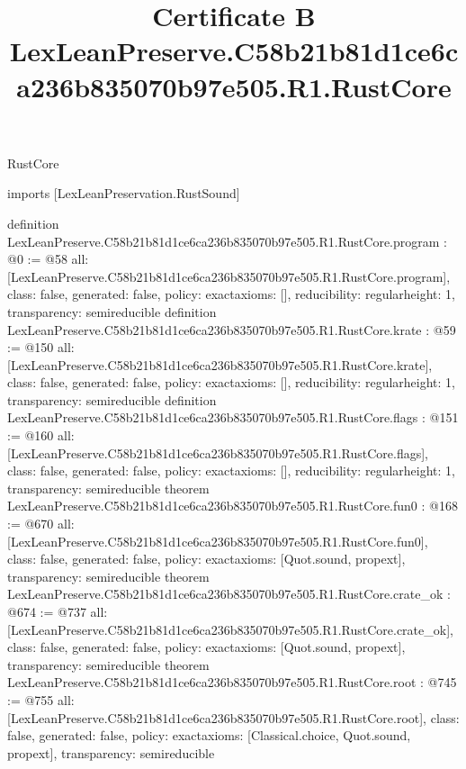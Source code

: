 \begin{lexlean}{RustCore}
\title{Certificate B LexLeanPreserve.C58b21b81d1ce6ca236b835070b97e505.R1.RustCore}
\begin{coremodule}
imports [LexLeanPreservation.RustSound]

definition LexLeanPreserve.C58b21b81d1ce6ca236b835070b97e505.R1.RustCore.program : @0 := @58 {
  all: [LexLeanPreserve.C58b21b81d1ce6ca236b835070b97e505.R1.RustCore.program],
  class: false,
  generated: false,
  policy: exact{axioms: []},
  reducibility: regular{height: 1},
  transparency: semireducible
}
definition LexLeanPreserve.C58b21b81d1ce6ca236b835070b97e505.R1.RustCore.krate : @59 := @150 {
  all: [LexLeanPreserve.C58b21b81d1ce6ca236b835070b97e505.R1.RustCore.krate],
  class: false,
  generated: false,
  policy: exact{axioms: []},
  reducibility: regular{height: 1},
  transparency: semireducible
}
definition LexLeanPreserve.C58b21b81d1ce6ca236b835070b97e505.R1.RustCore.flags : @151 := @160 {
  all: [LexLeanPreserve.C58b21b81d1ce6ca236b835070b97e505.R1.RustCore.flags],
  class: false,
  generated: false,
  policy: exact{axioms: []},
  reducibility: regular{height: 1},
  transparency: semireducible
}
theorem LexLeanPreserve.C58b21b81d1ce6ca236b835070b97e505.R1.RustCore.fun0 : @168 := @670 {
  all: [LexLeanPreserve.C58b21b81d1ce6ca236b835070b97e505.R1.RustCore.fun0],
  class: false,
  generated: false,
  policy: exact{axioms: [Quot.sound, propext]},
  transparency: semireducible
}
theorem LexLeanPreserve.C58b21b81d1ce6ca236b835070b97e505.R1.RustCore.crate_ok : @674 := @737 {
  all: [LexLeanPreserve.C58b21b81d1ce6ca236b835070b97e505.R1.RustCore.crate_ok],
  class: false,
  generated: false,
  policy: exact{axioms: [Quot.sound, propext]},
  transparency: semireducible
}
theorem LexLeanPreserve.C58b21b81d1ce6ca236b835070b97e505.R1.RustCore.root : @745 := @755 {
  all: [LexLeanPreserve.C58b21b81d1ce6ca236b835070b97e505.R1.RustCore.root],
  class: false,
  generated: false,
  policy: exact{axioms: [Classical.choice, Quot.sound, propext]},
  transparency: semireducible
}


\end{coremodule}
\end{lexlean}
